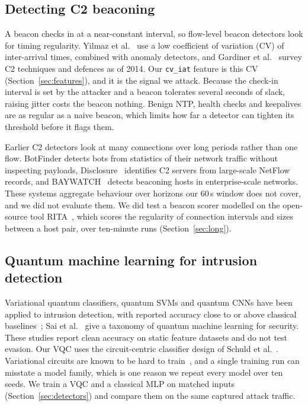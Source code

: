 \documentclass[preprint,12pt]{elsarticle}
\begin{document}
\subsection{Detecting C2 beaconing}
A beacon checks in at a near-constant interval, so flow-level beacon detectors look for timing
regularity. Yilmaz et al.~\cite{yilmaz2026} use a low coefficient of variation (CV) of inter-arrival
times, combined with anomaly detectors, and Gardiner et al.~\cite{gardiner2014} survey C2 techniques and
defences as of 2014. Our \texttt{cv\_iat} feature is this CV (Section~\ref{sec:features}), and it is the
signal we attack. Because the check-in interval is set by the attacker and a beacon tolerates several
seconds of slack, raising jitter costs the beacon nothing. Benign NTP, health checks and keepalives are
as regular as a naive beacon, which limits how far a detector can tighten its threshold before it
flags them.

Earlier C2 detectors look at many connections over long periods rather than one flow. BotFinder
\cite{tegeler2012} detects bots from statistics of their network traffic without inspecting payloads,
Disclosure~\cite{bilge2012} identifies C2 servers from large-scale NetFlow records, and
BAYWATCH~\cite{hu2016baywatch} detects beaconing hosts in enterprise-scale networks. These systems
aggregate behaviour over horizons our 60\,s window does not cover, and we did not evaluate them. We did
test a beacon scorer modelled on the open-source tool RITA~\cite{rita2026}, which scores the regularity
of connection intervals and sizes between a host pair, over ten-minute runs (Section~\ref{sec:long}).

\subsection{Quantum machine learning for intrusion detection}
Variational quantum classifiers, quantum SVMs and quantum CNNs have been applied to intrusion
detection, with reported accuracy close to or above classical
baselines~\cite{abreu2024,thomos2026,qvcnn2024}; Sai et al.~\cite{qml_sec_taxonomy2025} give a taxonomy
of quantum machine learning for security. These studies report clean accuracy on static feature
datasets and do not test evasion. Our VQC uses the circuit-centric classifier design of Schuld et
al.~\cite{schuld2020}. Variational circuits are known to be hard to train~\cite{cerezo2021}, and a single
training run can misstate a model family, which is one reason we repeat every model over ten seeds. We train a VQC and a classical MLP on matched inputs
(Section~\ref{sec:detectors}) and compare them on the same captured attack traffic.
\end{document}
